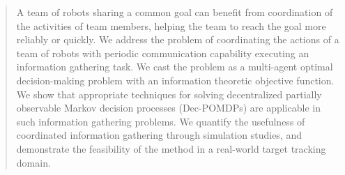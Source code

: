 \begin{abstract}
A team of robots sharing a common goal can benefit from coordination of the activities of team members, helping the team to reach the goal more reliably or quickly.
We address the problem of coordinating the actions of a team of robots with periodic communication capability executing an information gathering task.
We cast the problem as a multi-agent optimal decision-making problem with an information theoretic objective function.
We show that appropriate techniques for solving decentralized partially observable Markov decision processes (Dec-POMDPs) are applicable in such information gathering problems.
We quantify the usefulness of coordinated information gathering through simulation studies, and demonstrate the feasibility of the method in a real-world target tracking domain.
\end{abstract}